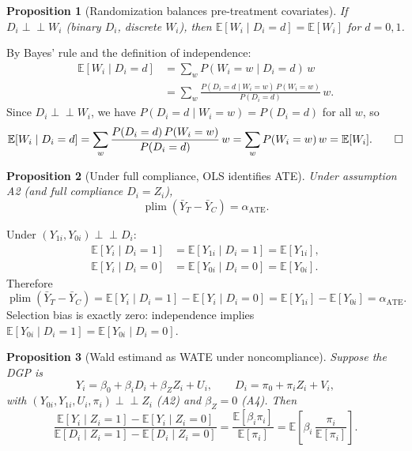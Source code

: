 \documentclass[12pt,a4paper]{article}
\theoremstyle{plain}
\newtheorem{propositio}{Proposition}[section]
\theoremstyle{definition}
\renewenvironment{proof}{\pushQED{\qed}\normalfont}{\popQED\par\nobreak}
\newcommand{\E}{\mathbb{E}}
\newcommand{\plim}{\operatorname{plim}}
\newcommand{\ind}{\perp\!\!\!\perp}
\newcommand{\ATE}{\alpha_{\mathrm{ATE}}}
\begin{document}
\begin{propositio}[Randomization balances pre-treatment covariates\label{prop:rct_balance}]
If $D_i\ind W_i$ (binary $D_i$, discrete $W_i$), then $\E[W_i\mid D_i=d]=\E[W_i]$ for $d=0,1$.
\end{propositio}

\begin{proof}
By Bayes' rule and the definition of independence:
\begin{align*}
  \E[W_i\mid D_i=d]
  &= \sum_w P(W_i=w\mid D_i=d)\,w\\
  &= \sum_w \frac{P(D_i=d\mid W_i=w)\,P(W_i=w)}{P(D_i=d)}\,w.
\end{align*}
Since $D_i\ind W_i$, we have $P(D_i=d\mid W_i=w)=P(D_i=d)$ for all $w$, so
\[
  \E[W_i\mid D_i=d]
  = \sum_w \frac{P(D_i=d)\,P(W_i=w)}{P(D_i=d)}\,w
  = \sum_w P(W_i=w)\,w
  = \E[W_i]. \qedhere
\]
\end{proof}

\begin{propositio}[Under full compliance, OLS identifies ATE\label{prop:rct_ate}]
Under assumption A2 (and full compliance $D_i=Z_i$),
\[
  \plim(\bar Y_T - \bar Y_C) = \ATE.
\]
\end{propositio}

\begin{proof}
Under $(Y_{1i},Y_{0i})\ind D_i$:
\[
  \begin{aligned}
    \E[Y_i\mid D_i=1] &= \E[Y_{1i}\mid D_i=1] = \E[Y_{1i}],\\
    \E[Y_i\mid D_i=0] &= \E[Y_{0i}\mid D_i=0] = \E[Y_{0i}].
  \end{aligned}
\]
Therefore
\[
  \plim(\bar Y_T-\bar Y_C)
  = \E[Y_i\mid D_i=1]-\E[Y_i\mid D_i=0]
  = \E[Y_{1i}]-\E[Y_{0i}]
  = \ATE.
\]
Selection bias is exactly zero: independence implies $\E[Y_{0i}\mid D_i=1]=\E[Y_{0i}\mid D_i=0]$.
\end{proof}

\begin{propositio}[Wald estimand as WATE under noncompliance\label{prop:wate}]
Suppose the DGP is
\[
  Y_i = \beta_0 + \beta_i D_i + \beta_Z Z_i + U_i, \qquad
  D_i = \pi_0 + \pi_i Z_i + V_i,
\]
with $(Y_{0i},Y_{1i},U_i,\pi_i)\ind Z_i$ (A2) and $\beta_Z=0$ (A4).  Then
\[
  \frac{\E[Y_i\mid Z_i=1]-\E[Y_i\mid Z_i=0]}{\E[D_i\mid Z_i=1]-\E[D_i\mid Z_i=0]}
  = \frac{\E[\beta_i\pi_i]}{\E[\pi_i]}
  = \E\!\left[\beta_i\,\frac{\pi_i}{\E[\pi_i]}\right].
\]
\end{propositio}
\end{document}
